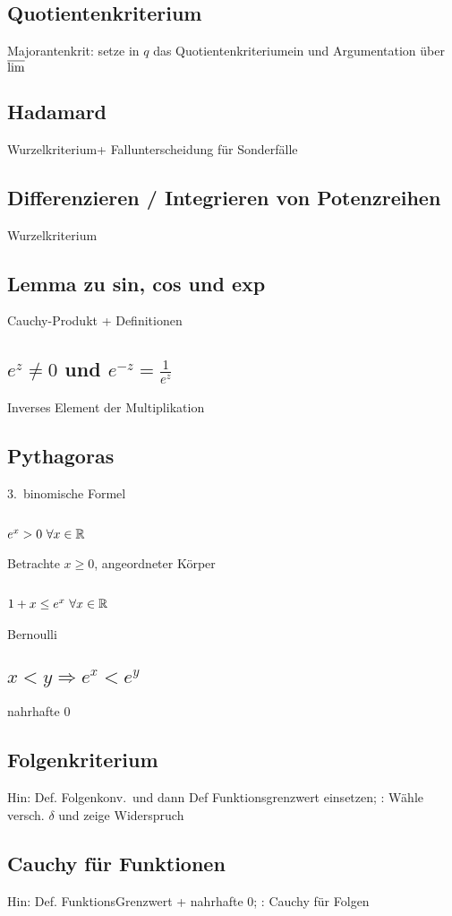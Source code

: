 \subsection{Quotientenkriterium }
 Majorantenkrit: setze in $q$ das Quotientenkriteriumein und Argumentation über $\varlimsup$
\subsection{Hadamard }
 Wurzelkriterium+ Fallunterscheidung für Sonderfälle
\subsection{Differenzieren / Integrieren von Potenzreihen}
 Wurzelkriterium
\subsection{Lemma zu sin, cos und exp }
 Cauchy-Produkt + Definitionen
\subsection{$e^z \neq 0$ und $e^{-z} = \frac{1}{e^{z}}$ }
 Inverses Element der Multiplikation
\subsection{Pythagoras }
 3.\ binomische Formel
\subsection{$e^x > 0\ \forall x \in \R$ }
 Betrachte $x \geq 0$, angeordneter Körper
\subsection{$1+x \leq e^x\ \forall x \in \R$ }
 Bernoulli
\subsection{$x<y \Rightarrow e^x < e^y$ }
 nahrhafte 0
\subsection{Folgenkriterium }
 Hin: Def. Folgenkonv.\ und dann Def Funktionsgrenzwert einsetzen; : Wähle versch. $\delta$ und zeige Widerspruch
\subsection{Cauchy für Funktionen }
 Hin: Def. FunktionsGrenzwert + nahrhafte 0; : Cauchy für Folgen
